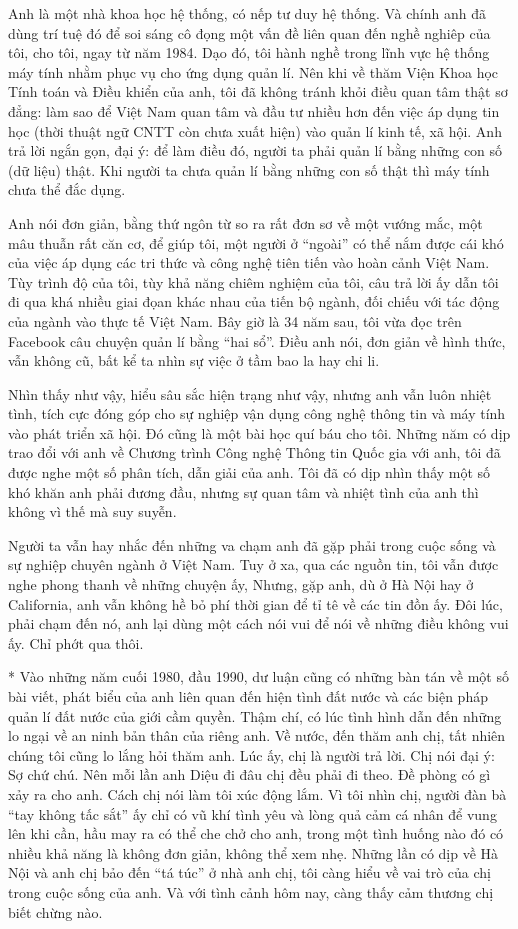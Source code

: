 Anh là một nhà khoa học hệ thống, có nếp tư duy hệ thống. Và chính anh đã dùng trí tuệ đó để soi sáng cô đọng một vấn đề liên quan đến nghề nghiêp của tôi, cho tôi, ngay từ năm 1984. Dạo đó, tôi hành nghề trong lĩnh vực hệ thống máy tính nhằm phục vụ cho ứng dụng quản lí. 
Nên khi về thăm Viện Khoa học Tính toán và Điều khiển của anh, tôi đã không tránh khỏi điều quan tâm thật sơ đẳng: làm sao để Việt Nam quan tâm và đầu tư nhiều hơn đến việc áp dụng tin học (thời thuật ngữ CNTT còn chưa xuất hiện) vào quản lí kinh tế, xã hội. Anh trả lời ngắn gọn, đại ý: để làm điều đó, người ta phải quản lí bằng những con số (dữ liệu) thật. Khi người ta chưa quản lí bằng những con số thật thì máy tính chưa thể đắc dụng.

Anh nói đơn giản, bằng thứ ngôn từ so ra rất đơn sơ về một vướng mắc, một mâu thuẫn rất căn cơ, để giúp tôi, một người ở “ngoài” có thể nắm được cái khó của việc áp dụng các tri thức và công nghệ tiên tiến vào hoàn cảnh Việt Nam. Tùy trình độ của tôi, tùy khả năng chiêm nghiệm của tôi, câu trả lời ấy dẫn tôi đi qua khá nhiều giai đọan khác nhau của tiến bộ ngành, đối chiếu với tác động của ngành vào thực tế Việt Nam. Bây giờ là 34 năm sau, tôi vừa đọc trên Facebook câu chuyện quản lí bằng “hai sổ”. Điều anh nói, đơn giản về hình thức, vẫn không cũ, bất kể ta nhìn sự việc ở tầm bao la hay chi li.

Nhìn thấy như vậy, hiểu sâu sắc hiện trạng như vậy, nhưng anh vẫn luôn nhiệt tình, tích cực đóng góp cho sự nghiệp vận dụng công nghệ thông tin và máy tính vào phát triển xã hội. Đó cũng là một bài học quí báu cho tôi. Những năm có dịp trao đổi với anh về Chương trình Công nghệ Thông tin Quốc gia với anh, tôi đã được nghe một số phân tích, dẫn giải của anh. Tôi đã có dịp nhìn thấy một số khó khăn anh phải đương đầu, nhưng sự quan tâm và nhiệt tình của anh thì không vì thế mà suy suyễn.

Người ta vẫn hay nhắc đến những va chạm anh đã gặp phải trong cuộc sống và sự nghiệp chuyên ngành ở Việt Nam. Tuy ở xa, qua các nguồn tin, tôi vẫn được nghe phong thanh về những chuyện ấy, Nhưng, gặp anh, dù ở Hà Nội hay ở California, anh vẫn không hề bỏ phí thời gian để tỉ tê về các tin đồn ấy. Đôi lúc, phải chạm đến nó, anh lại dùng một cách nói vui để nói về những điều không vui ấy. Chỉ phớt qua thôi.

*
Vào những năm cuối 1980, đầu 1990, dư luận cũng có những bàn tán về một số bài viết, phát biểu của anh liên quan đến hiện tình đất nước và các biện pháp quản lí đất nước của giới cầm quyền. Thậm chí, có lúc tình hình dẫn đến những lo ngại về an ninh bản thân của riêng anh. Về nước, đến thăm anh chị, tất nhiên chúng tôi cũng lo lắng hỏi thăm anh. Lúc ấy, chị là người trả lời. Chị nói đại ý: Sợ chứ chú. Nên mỗi lần anh Diệu đi đâu chị đều phải đi theo. Đề phòng có gì xảy ra cho anh. Cách chị nói làm tôi xúc động lắm. Vì tôi nhìn chị, người đàn bà “tay không tấc sắt” ấy chỉ có vũ khí tình yêu và lòng quả cảm cá nhân để vung lên khi cần, hầu may ra có thể che chở cho anh, trong một tình huống nào đó có nhiều khả năng là không đơn giản, không thể xem nhẹ. Những lần có dịp về Hà Nội và anh chị bảo đến “tá túc” ở nhà anh chị, tôi càng hiểu về vai trò của chị trong cuộc sống của anh. Và với tình cảnh hôm nay, càng thấy cảm thương chị biết chừng nào.

